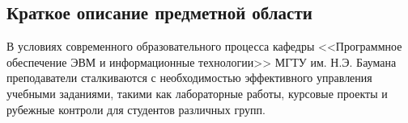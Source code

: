 %
%
% 
%

\subsection*{Краткое описание предметной области}

В условиях современного образовательного процесса кафедры <<Программное обеспечение ЭВМ и информационные технологии>> МГТУ им. Н.Э. Баумана преподаватели сталкиваются с необходимостью эффективного управления учебными заданиями, такими как лабораторные работы, курсовые проекты и рубежные контроли для студентов различных групп. 


